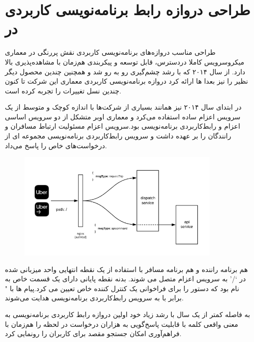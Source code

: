 \section{طراحی دروازه رابط برنامه‌نویسی کاربردی در } 
طراحی مناسب دروازه‌های برنامه‌نویسی کاربردی نقش پررنگی در معماری میکروسرویس کاملا دردسترس، قابل توسعه و پیکربندی هم‌زمان با مشاهده‌پذیری بالا دارد. از سال ۲۰۱۴ که  با رشد چشم‌گیری رو به رو شد و همچنین چندین محصول دیگر نظیر  را نیز بعدا ها ارائه کرد دروازه برنامه‌نویسی کاربردی معماری این شرکت تا کنون چندین نسل تغییرات را تجربه کرده است. \cite{APIGateway}

در ابتدای سال ۲۰۱۴  نیز همانند بسیاری از شرکت‌ها با اندازه کوچک و متوسط از یک سرویس اعزام ساده استفاده می‌کرد و معماری اوبر متشکل از دو سرویس اساسی اعزام و رابط‌کاربردی برنامه‌نویسی  بود.سرویس اعزام مسئولیت ارتباط مسافران و رانندگان را بر عهده داشت و سرویس رابط‌کاربردی برنامه‌نویسی مجموعه ای از درخواست‌های خاص را پاسخ می‌داد.


\begin{figure}[h]
\label{fig:apigateway_gen1}
\centering
\includegraphics[width=10cm]{gen1_apigateway.png}
\end{figure}

هم برنامه راننده و هم برنامه مسافر با استفاده از یک نقطه انتهایی واحد میزبانی شده در ‘/’ به سرویس اعزام متصل می شوند. بدنه نقطه پایانی دارای یک قسمت خاص به نام  بود که دستور  را برای فراخوانی یک کنترل کننده خاص تعیین می کرد.پیام ها با " برابر با  به سرویس رابط‌کاربردی برنامه‌نویسی هدایت می‌شوند.

به فاصله کمتر از یک سال  با رشد زیاد خود اولین دروازه رابط کاربردی برنامه‌نویسی به معنی واقعی کلمه با قابلیت پاسخ‌گویی به هزاران درخواست در لحظه را هم‌زمان با فراهم‌آوری امکان جستجو مقصد برای کاربران را رونمایی کرد.

